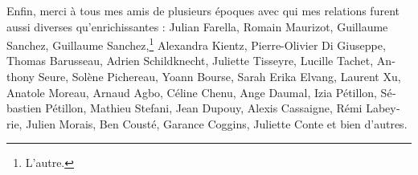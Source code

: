 \begin{otherlanguage}{french}
\begin{SingleSpace}
  Enfin, merci à tous mes amis de plusieurs époques avec qui mes relations
  furent aussi diverses qu'enrichissantes : Julian Farella, Romain
  Maurizot, Guillaume Sanchez, Guillaume Sanchez,\footnote{L'autre.} Alexandra
  Kientz, Pierre-Olivier Di Giuseppe, Thomas Barusseau, Adrien Schildknecht,
  Juliette Tisseyre, Lucille Tachet, Anthony Seure, Solène Pichereau, Yoann
  Bourse, Sarah Erika Elvang, Laurent Xu, Anatole Moreau, Arnaud Agbo, Céline
  Chenu, Ange Daumal, Izia Pétillon, Sébastien Pétillon, Mathieu Stefani, Jean
  Dupouy, Alexis Cassaigne, Rémi Labeyrie, Julien Morais, Ben Cousté, Garance
  Coggins, Juliette Conte et bien d'autres.

\end{SingleSpace}
\end{otherlanguage}
